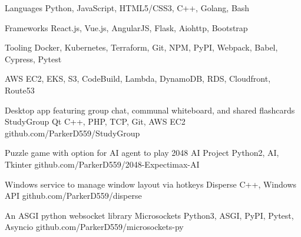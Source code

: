 \documentclass[]{awesome-cv}
\begin{document}
\vspace{-2mm}
\begin{cvskills}
	\cvskill
	{Languages}
	{Python, JavaScript, HTML5/CSS3, C++, Golang, Bash}

	\cvskill
	{Frameworks}
	{React.js, Vue.js, AngularJS, Flask, Aiohttp, Bootstrap}

	\cvskill
	{Tooling}
	{Docker, Kubernetes, Terraform, Git, NPM, PyPI, Webpack, Babel, Cypress, Pytest}

	\cvskill
	{AWS}
	{EC2, EKS, S3, CodeBuild, Lambda, DynamoDB, RDS, Cloudfront, Route53}
\end{cvskills}

\begin{cventries}
	\cventry
	{Desktop app featuring group chat, communal whiteboard, and shared flashcards}
	{StudyGroup}
	{Qt C++, PHP, TCP, Git, AWS EC2}
	{github.com/ParkerD559/StudyGroup}
	{}

	\vspace{-5mm}
	\cventry
	{Puzzle game with option for AI agent to play}
	{2048 AI Project}
	{Python2, AI, Tkinter}
	{github.com/ParkerD559/2048-Expectimax-AI}
	{}

	\vspace{-5mm}
	\cventry
	{Windows service to manage window layout via hotkeys}
	{Disperse}
	{C++, Windows API}
	{github.com/ParkerD559/disperse}
	{}

	\vspace{-5mm}
	\cventry
	{An ASGI python websocket library}
	{Microsockets}
	{Python3, ASGI, PyPI, Pytest, Asyncio}
	{github.com/ParkerD559/microsockets-py}
	{}
	
	\vspace{-5mm}
\end{cventries}

\ 
\end{document}
